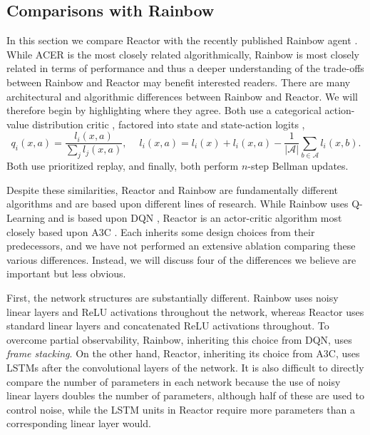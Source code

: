 \documentclass{article}
\begin{document}
\subsection{Comparisons with Rainbow}
In this section we compare Reactor with the recently published Rainbow agent 
\citep{rainbow}. While ACER is the most closely related algorithmically, Rainbow 
is most closely related in terms of performance and thus a deeper understanding 
of the trade-offs between Rainbow and Reactor may benefit interested readers. 
There are many architectural and algorithmic differences between Rainbow and 
Reactor. We will therefore begin by highlighting where they agree. Both use a 
categorical action-value distribution critic 
\citep{bellemare2017distributional}, factored into state and state-action logits 
\citep{wang2015dueling},
\begin{equation*}
q_i(x, a) = \frac{l_i(x, a)}{\sum_j l_j(x, a)},\ \quad l_i(x, a) = l_i(x) + l_i(x, a) - \frac{1}{|\mathcal{A}|} \sum_{b \in \mathcal{A}} l_i(x, b).
\end{equation*}
Both use prioritized replay, and finally, both perform $n$-step Bellman updates.

Despite these similarities, Reactor and Rainbow are fundamentally different 
algorithms and are based upon different lines of research. While Rainbow uses 
Q-Learning and is based upon DQN \citep{mnih15human}, Reactor is an actor-critic 
algorithm most closely based upon A3C \citep{mnih2016asynchronous}. Each 
inherits some design choices from their predecessors, and we have not performed 
an extensive ablation comparing these various differences. Instead, we will 
discuss four of the differences we believe are important but less obvious.

First, the network structures are substantially different. Rainbow uses noisy 
linear layers and ReLU activations throughout the network, whereas Reactor uses 
standard linear layers and concatenated ReLU activations throughout. To overcome 
partial observability, Rainbow, inheriting this choice from DQN, uses 
\textit{frame stacking}. On the other hand, Reactor, inheriting its choice from 
A3C, uses LSTMs after the convolutional layers of the network. It is also 
difficult to directly compare the number of parameters in each network because 
the use of noisy linear layers doubles the number of parameters, although half 
of these are used to control noise, while the LSTM units in Reactor require more 
parameters than a corresponding linear layer would.
\end{document}
